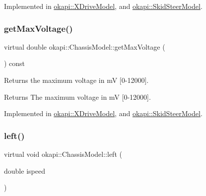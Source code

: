 Implemented in \mbox{\hyperlink{classokapi_1_1XDriveModel_aa5b5c3431c99c612ade5c97858478828}{okapi\+::\+X\+Drive\+Model}}, and \mbox{\hyperlink{classokapi_1_1SkidSteerModel_a7e2fcfb65e940ea4d71780966b4b5b68}{okapi\+::\+Skid\+Steer\+Model}}.

\mbox{\label{classokapi_1_1ChassisModel_a3ced2121524ae523592db64733c69472}} 
\subsubsection{\texorpdfstring{getMaxVoltage()}{getMaxVoltage()}}
{\footnotesize\ttfamily virtual double okapi\+::\+Chassis\+Model\+::get\+Max\+Voltage (\begin{DoxyParamCaption}{ }\end{DoxyParamCaption}) const\hspace{0.3cm}{\ttfamily [pure virtual]}}

Returns the maximum voltage in mV \mbox{[}0-\/12000\mbox{]}.

\begin{DoxyReturn}{Returns}
The maximum voltage in mV \mbox{[}0-\/12000\mbox{]}. 
\end{DoxyReturn}


Implemented in \mbox{\hyperlink{classokapi_1_1XDriveModel_a402487e35a717c47cfcc85ad1cfb0861}{okapi\+::\+X\+Drive\+Model}}, and \mbox{\hyperlink{classokapi_1_1SkidSteerModel_ad4849d18c3a244eb60e1056860a3c4cf}{okapi\+::\+Skid\+Steer\+Model}}.

\mbox{\label{classokapi_1_1ChassisModel_aa2008856c169eb64c6648bc64c31c504}} 
\subsubsection{\texorpdfstring{left()}{left()}}
{\footnotesize\ttfamily virtual void okapi\+::\+Chassis\+Model\+::left (\begin{DoxyParamCaption}\item[{double}]{ispeed }\end{DoxyParamCaption})\hspace{0.3cm}{\ttfamily [pure virtual]}}

